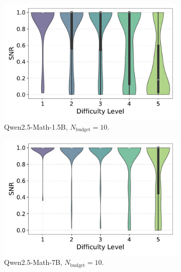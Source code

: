 \begin{figure}[h!]
  \centering
  \begin{subfigure}{0.49\textwidth}
      \centering
      \includegraphics[width=\textwidth]{figs/QWEN-MATH-1.5B_violin_maj10_SNR_04.pdf}
      \caption{Qwen2.5-Math-1.5B, $N_{\text{budget}}=10$.}
      \label{fig:QWEN-MATH-1.5B_budget_10_SNR_04}
  \end{subfigure}
  \hfill
  \begin{subfigure}{0.49\textwidth}
      \centering
      \includegraphics[width=\textwidth]{figs/QWEN-MATH-7B_violin_maj10_SNR_04.pdf}
        \caption{Qwen2.5-Math-7B, $N_{\text{budget}}=10$.}
      \label{fig:QWEN-MATH-7B_budget_10_SNR_04}
  \end{subfigure}
  \vfill
  \begin{subfigure}{0.49\textwidth}
      \centering

\end{subfigure}
\end{figure}
